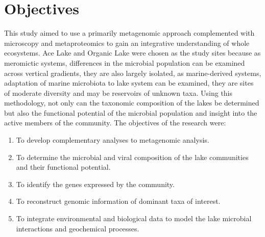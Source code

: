 \section{Objectives}
This study aimed to use a primarily metagenomic approach complemented with microscopy and metaproteomics to gain an integrative understanding of whole ecosystems.
Ace Lake and Organic Lake were chosen as the study sites because as meromictic systems, differences in the microbial population can be examined across vertical gradients, they are also largely isolated, as marine-derived systems, adaptation of marine microbiota to lake system can be examined, they are sites of moderate diversity and may be reservoirs of unknown taxa.
Using this methodology, not only can the taxonomic composition of the lakes be determined but also the functional potential of the microbial population and insight into the active members of the community.
The objectives of the research were:

\begin{enumerate}
\item 
  To develop complementary analyses to metagenomic analysis.

\item
  To determine the microbial and viral composition of the lake communities and their functional potential.

\item
  To identify the genes expressed by the community.

\item
  To reconstruct genomic information of dominant taxa of interest.

\item
  To integrate environmental and biological data to model the lake microbial interactions and geochemical processes.

\end{enumerate}
